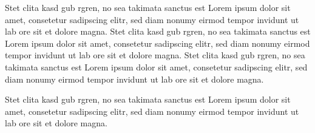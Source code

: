 Stet clita kasd gub rgren, no sea takimata sanctus est Lorem ipsum dolor sit amet, consetetur sadipscing elitr, sed diam nonumy eirmod tempor invidunt ut lab ore sit et dolore magna. Stet clita kasd gub rgren, no sea takimata sanctus est Lorem ipsum dolor sit amet, consetetur sadipscing elitr, sed diam nonumy eirmod tempor invidunt ut lab ore sit et dolore magna. Stet clita kasd gub rgren, no sea takimata sanctus est Lorem ipsum dolor sit amet, consetetur sadipscing elitr, sed diam nonumy eirmod tempor invidunt ut lab ore sit et dolore magna. 

Stet clita kasd gub rgren, no sea takimata sanctus est Lorem ipsum dolor sit amet, consetetur sadipscing elitr, sed diam nonumy eirmod tempor invidunt ut lab ore sit et dolore magna.